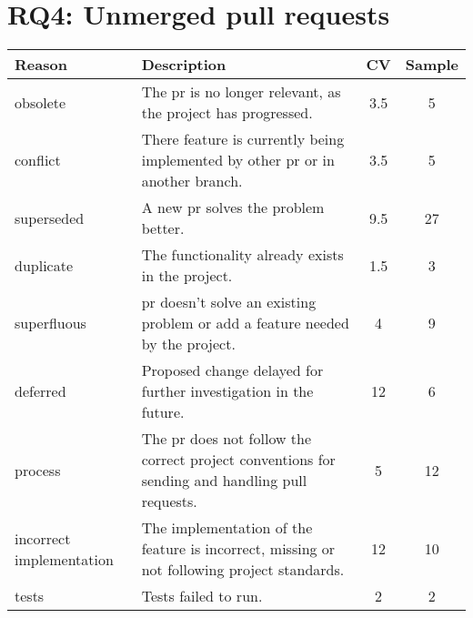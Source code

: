 \documentclass{sig-alternate}
\begin{document}

\section{RQ4: Unmerged pull requests}

\begin{table}
  \begin{small}
  \centering
  \begin{tabular}{p{6em}p{14em}cc}
    \hline
    \textbf{Reason} & \textbf{Description} & \textbf{CV} &
    \textbf{Sample}
\\
    \hline
    \textsf{obsolete} &	The {\sc pr} is no longer relevant, as the project
    has progressed. & 3.5 & 5\\

    \textsf{conflict} &	There feature is currently being implemented by other
    {\sc pr} or in another branch. &  3.5 & 5\\

    \textsf{superseded} &	A new {\sc pr} solves the problem better. & 9.5 & 27\\

    \textsf{duplicate} & The functionality already exists in the project. & 1.5 & 3 \\

    \textsf{superfluous} & {\sc pr} doesn't solve an existing problem or add a
    feature needed by the project. & 4 & 9\\

    \textsf{deferred} & Proposed change delayed for further investigation in the
    future. & 12 & 6\\

    \textsf{process} & The {\sc pr} does not follow the correct project
    conventions for sending and handling pull requests. & 5 & 12\\

    \textsf{incorrect implementation} &	The implementation of the feature is
    incorrect, missing or not following project standards. & 12 & 10\\

    \textsf{tests} & Tests failed to run. & 2 & 2\\


\end{tabular}
\end{small}
\end{table}
\end{document}
